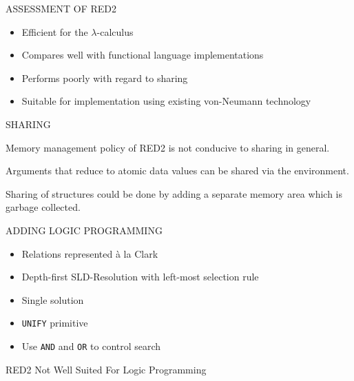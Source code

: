 \begin{slide}{}
\begin{center}
ASSESSMENT OF RED2\\[2in]
\end{center}

\begin{itemize}
\item Efficient for the $\lambda$-calculus
\item Compares well with functional language implementations
\item Performs poorly with regard to sharing
\item Suitable for implementation using existing von-Neumann technology
\end{itemize}

\end{slide}


\begin{slide}{}
\begin{center}
SHARING
\end{center}

Memory management policy of RED2 is not conducive to sharing in
general.\\

\vspace*{2in}

Arguments that reduce to atomic data values can be shared via the
environment. 

Sharing of structures could be done by adding a separate memory area
which is garbage collected.
\end{slide}


\begin{slide}{}
\begin{center}
ADDING LOGIC PROGRAMMING\\[.5in]
\end{center}

\begin{itemize}
\item Relations represented \`{a} la Clark
\item Depth-first SLD-Resolution with left-most selection rule
\item Single solution
\item {\tt UNIFY} primitive
\item Use {\tt AND} and {\tt OR} to control search
\end{itemize}

RED2 Not Well Suited For Logic Programming

\end{slide}
